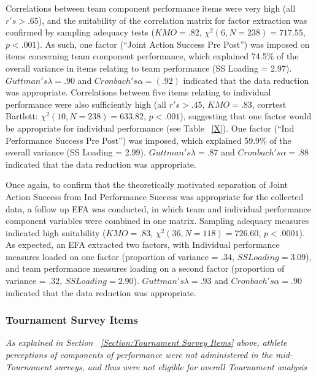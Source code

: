 Correlations between team component performance items were very high (all $r's > .65$), and the suitability of the correlation matrix for factor extraction was confirmed by sampling adequacy tests ($KMO = .82$, $\chi^2(6, N = 238) = 717.55$, $p < .001$).  As such, one factor (``Joint Action Success Pre Post'') was imposed on items concerning team component performance, which explained 74.5\% of the overall variance in items relating to team performance (SS Loading = 2.97). $Guttman's \lambda =.90$ and $Cronbach's \alpha = (.92)$ indicated that the data reduction was appropriate.  Correlations between five items relating to individual performance were also sufficiently high (all $r's > .45$, $KMO = .83$, corrtest Bartlett: $\chi^2(10, N = 238) = 633.82$, $p < .001$), suggesting that one factor would be appropriate for individual performance (see Table ~\ref{X}).  One factor (``Ind Performance Success Pre Post'') was imposed, which explained 59.9\% of the overall variance (SS Loading = 2.99).  $Guttman's\lambda =.87$ and $Cronbach's \alpha = .88$ indicated that the data reduction was appropriate.

Once again, to confirm that the theoretically motivated separation of Joint Action Success from Ind Performance Success was appropriate for the collected data, a follow up EFA was conducted, in which team and individual performance component variables were combined in one matrix. Sampling adequacy measures indicated high suitability ($KMO = .83$, $\chi^2(36, N = 118) = 726.60$, $p < .0001$).  As expected, an EFA extracted two factors, with Individual performance measures loaded on one factor (proportion of variance = .34, $SS Loading = 3.09$), and team performance measures loading on a second factor (proportion of variance = .32, $SS Loading = 2.90$). $Guttman's \lambda =.93$ and $Cronbach's \alpha = .90$ indicated that the data reduction was appropriate.


\subsubsection{Tournament Survey Items}

\textit{As explained in Section ~\ref{Section:Tournament Survey Items} above, athlete perceptions of components of performance were not administered in the mid-Tournament surveys, and thus were not eligible for overall Tournament analysis}


